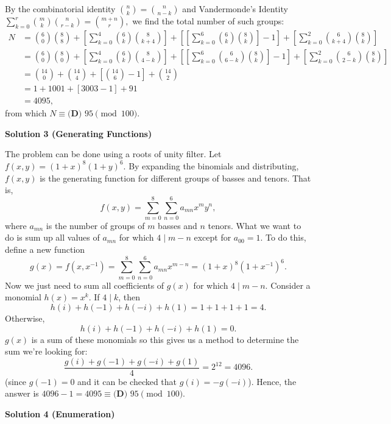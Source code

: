 \begin{enumerate}
\begin{enumerate}
            \end{enumerate}
            By the combinatorial identity $\binom{n}{k}=\binom{n}{n-k}$ and Vandermonde's Identity $\sum_{k=0}^{r}\binom{m}{k}\binom{n}{r-k}=\binom{m+n}{r},$ we find the total number of such groups:
 \begin{align*} N&=\binom{6}{0}\binom{8}{8}+\left[\sum_{k=0}^{4}\binom{6}{k}\binom{8}{k+4}\right]+\left[\left[\sum_{k=0}^{6}\binom{6}{k}\binom{8}{k}\right]-1\right]+\left[\sum_{k=0}^{2}\binom{6}{k+4}\binom{8}{k}\right] \\ &=\binom{6}{0}\binom{8}{0}+\left[\sum_{k=0}^{4}\binom{6}{k}\binom{8}{4-k}\right]+\left[\left[\sum_{k=0}^{6}\binom{6}{6-k}\binom{8}{k}\right]-1\right]+\left[\sum_{k=0}^{2}\binom{6}{2-k}\binom{8}{k}\right] \\ &=\binom{14}{0}+\binom{14}{4}+\left[\binom{14}{6}-1\right]+\binom{14}{2} \\ &=1+1001+[3003-1]+91 \\ &=4095, \end{align*}
from which $N\equiv\boxed{\textbf{(D) } 95}\pmod{100}.$




\textbf{Solution 3 (Generating Functions)}

The problem can be done using a roots of unity filter. Let $f(x,y)=(1+x)^8(1+y)^6$. By expanding the binomials and distributing, $f(x,y)$ is the generating function for different groups of basses and tenors. That is, 
 \[f(x,y)=\sum_{m=0}^8\sum_{n=0}^6 a_{mn}x^my^n,\]where $a_{mn}$ is the number of groups of $m$ basses and $n$ tenors. What we want to do is sum up all values of $a_{mn}$ for which $4\mid m-n$ except for $a_{00}=1$. To do this, define a new function 
 \[g(x)=f(x,x^{-1})=\sum_{m=0}^8\sum_{n=0}^6 a_{mn}x^{m-n}=(1+x)^8(1+x^{-1})^6.\]Now we just need to sum all coefficients of $g(x)$ for which $4\mid m-n$. Consider a monomial $h(x)=x^k$. If $4\mid k$, then 
 \[h(i)+h(-1)+h(-i)+h(1)=1+1+1+1=4.\]Otherwise, 
 \[h(i)+h(-1)+h(-i)+h(1)=0.\]$g(x)$ is a sum of these monomials so this gives us a method to determine the sum we're looking for:
 \[\frac{g(i)+g(-1)+g(-i)+g(1)}{4}=2^{12}=4096.\](since $g(-1)=0$ and it can be checked that $g(i)=-g(-i)$). Hence, the answer is $4096-1=4095\equiv\boxed{\textbf{(D) } 95}\pmod{100}$.

 



\textbf{Solution 4 (Enumeration)}


\end{enumerate}
